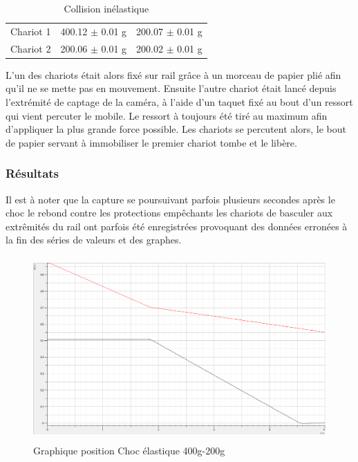 \begin{table}[h]
    \centering
    \caption{Collision inélastique}
    \begin{tabular}{|l|l|l|}
	\hline
	Chariot 1 & 400.12 $\pm$ 0.01 g & 200.07 $\pm$ 0.01 g \\
	Chariot 2 & 200.06 $\pm$ 0.01 g & 200.02 $\pm$ 0.01 g \\
	\hline
    \end{tabular}
\end{table}

L'un des chariots était alors fixé sur rail grâce à un morceau de papier plié afin qu'il ne se mette pas en mouvement. Ensuite l'autre chariot était lancé depuis l'extrémité de captage de la caméra, à l'aide d'un taquet fixé au bout d'un ressort qui vient percuter le mobile. Le ressort à toujours été tiré au maximum afin d'appliquer la plus grande force possible. Les chariots se percutent alors, le bout de papier servant à immobiliser le premier chariot tombe et le libère.

\newpage
\subsubsection{Résultats}

Il est à noter que la capture se poursuivant parfois plusieurs secondes après le choc le rebond contre les protections empêchants les chariots de basculer aux extrêmités du rail ont parfois été enregistrées provoquant des données erronées à la fin des séries de valeurs et des graphes.

\begin{figure}[h]
    \caption[Graphique position Choc élastique 400g-200g]{Graphique position Choc élastique 400g-200g}
    \centering
    \includegraphics[height=19em]{Data/400-200ela01.png}
\end{figure}

